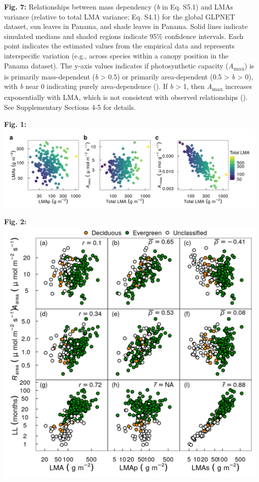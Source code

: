 \documentclass[
  12pt,
  letterpaper,
  DIV=11,
  numbers=noendperiod]{scrartcl}
\begin{document}
\textbf{Fig. 7:} Relationships between mass dependency (\emph{b} in Eq.
S5.1) and LMAs variance (relative to total LMA variance; Eq. S4.1) for
the global GLPNET dataset, sun leaves in Panama, and shade leaves in
Panama. Solid lines indicate simulated medians and shaded regions
indicate 95\% confidence intervals. Each point indicates the estimated
values from the empirical data and represents interspecific variation
(e.g., across species within a canopy position in the Panama dataset).
The y-axis values indicates if photosynthetic capacity
(\emph{A}\textsubscript{max}) is is primarily mass-dependent (\emph{b}
\textgreater{} 0.5) or primarily area-dependent (0.5 \textgreater{}
\emph{b} \textgreater{} 0), with \emph{b} near 0 indicating purely
area-dependence (). If
\emph{b} \textgreater{} 1, then \emph{A}\textsubscript{max} increases
exponentially with LMA, which is not consistent with observed
relationships (). See
Supplementary Sections 4-5 for details.

\newpage

\textbf{Fig. 1:} \includegraphics{../figs/hypo.png} \newpage

\textbf{Fig. 2:} \includegraphics{../figs/gl_point.png} \newpage
\end{document}
